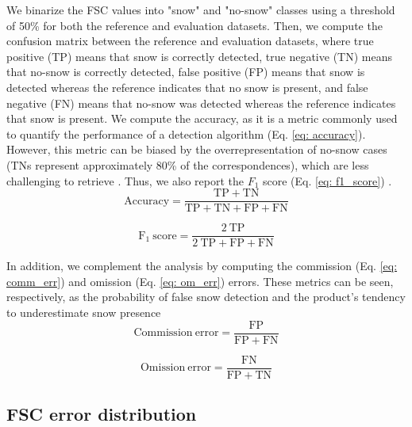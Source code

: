 \documentclass[tc, manuscript]{copernicus}
\begin{document}
We binarize the FSC values into "snow" and "no-snow" classes using a threshold of 50\% for both the reference and evaluation datasets. Then, we compute the confusion matrix between the reference and evaluation datasets, where true positive (TP) means that snow is correctly detected, true negative (TN) means that no-snow is correctly detected, false positive (FP) means that snow is detected whereas the reference indicates that no snow is present, and false negative (FN) means that no-snow was detected whereas the reference indicates that snow is present. We compute the accuracy, as it is a metric commonly used to quantify the performance of a detection algorithm (Eq. \ref{eq: accuracy}). However, this metric can be biased by the overrepresentation of no-snow cases (TNs represent approximately 80\% of the correspondences), which are less challenging to retrieve \citep{masson_assessment_2018}. Thus, we also report the $F_1$ score (Eq. \ref{eq: f1_score}) \citep{rittger_evaluation_2021, zhang_comparative_2020}.   
\begin{equation}
    \mathrm{Accuracy} = \frac{\mathrm{TP}+\mathrm{TN}}{\mathrm{TP}+\mathrm{TN}+\mathrm{FP}+\mathrm{FN}}
\label{eq: accuracy}
\end{equation}


\begin{equation}
    \mathrm{F_1 ~ score} = \frac{2~\mathrm{TP}}{2~\mathrm{TP}+\mathrm{FP}+\mathrm{FN}}
\label{eq: f1_score}
\end{equation}

In addition, we complement the analysis by computing the commission (Eq. \ref{eq: comm_err}) and omission (Eq. \ref{eq: om_err}) errors. These metrics can be seen, respectively, as the probability of false snow detection and the product's tendency to underestimate snow presence \citep{schwaizer2020SnowCoverExtentb}
\begin{equation}
    \mathrm{Commission ~ error} = \frac{\mathrm{FP}}{\mathrm{FP}+\mathrm{FN}}
\label{eq: comm_err}
\end{equation}


\begin{equation}
    \mathrm{Omission ~ error} = \frac{\mathrm{FN}}{\mathrm{FP}+\mathrm{TN}}
\label{eq: om_err}
\end{equation}


\subsection{FSC error distribution}
\label{subsec: methods_distribution}
\end{document}
